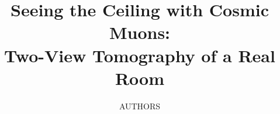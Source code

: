 \documentclass[11pt,a4paper]{article}
\title{Seeing the Ceiling with Cosmic Muons:\\Two-View Tomography of a Real Room}
\author{AUTHORS}
\date{}
\begin{document}
\maketitle
\begin{abstract}

\end{abstract}











\end{document}
